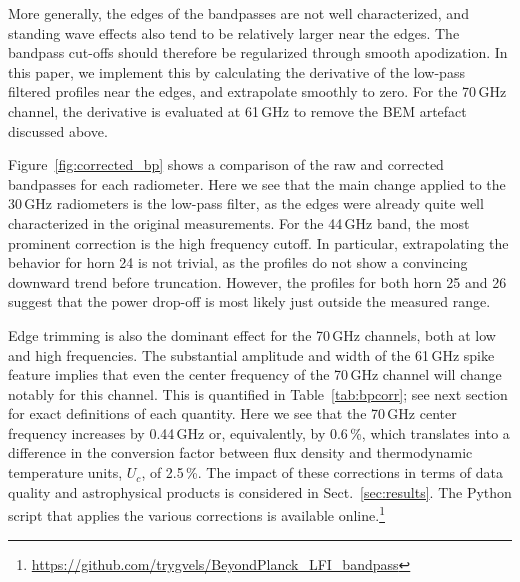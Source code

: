 \documentclass[twocolumn]{aa}
\newcommand{\?}[1]{\textcolor{red}{{\bf [#1]}}}
\begin{document}
More generally, the edges of the bandpasses are not well
characterized, and standing wave effects also tend to be relatively
larger near the edges. The bandpass cut-offs should therefore be
regularized through smooth apodization. In this paper, we implement
this by calculating the derivative of the low-pass filtered profiles
near the edges, and extrapolate smoothly to zero. For the 70\,GHz
channel, the derivative is evaluated at 61\,GHz to remove the BEM
artefact discussed above. 

Figure~\ref{fig:corrected_bp} shows a comparison of the raw and corrected
bandpasses for each radiometer. Here we see that the main change applied to the
30\,GHz radiometers is the low-pass filter, as the edges were already quite well
characterized in the original measurements. For the 44\,GHz band, the most
prominent correction is the high frequency cutoff. In particular, extrapolating
the behavior for horn 24 is not trivial, as the profiles do not show a
convincing downward trend before truncation. However, the profiles for both horn 25 and 26 suggest
that the power drop-off is most likely just outside the measured range. 

Edge trimming is also the dominant effect for the 70\,GHz channels,
both at low and high frequencies. The substantial amplitude and width
of the 61\,GHz spike feature implies that even the center frequency of
the 70\,GHz channel will change notably for this channel. This is
quantified in Table~\ref{tab:bpcorr}; see next section for exact definitions of each quantity. Here
we see that the 70\,GHz center frequency increases by 0.44\,GHz or,
equivalently, by 0.6\,\%, which translates into a difference in the
conversion factor between flux density and thermodynamic temperature
units, $U_c$, of 2.5\,\%. The impact of these corrections in terms of
data quality and astrophysical products is considered in
Sect.~\ref{sec:results}. The Python script that applies the various
corrections is available
online.\footnote{\url{https://github.com/trygvels/BeyondPlanck_LFI_bandpass}}
\end{document}
